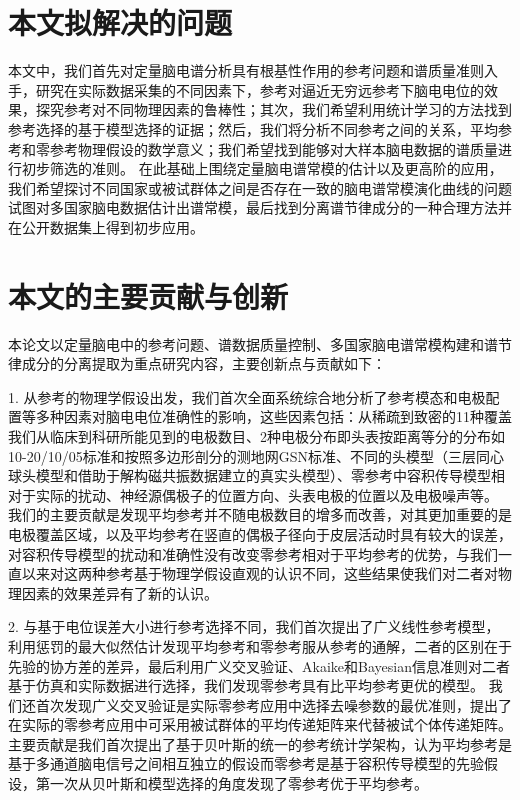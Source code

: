 \section{本文拟解决的问题}
本文中，我们首先对定量脑电谱分析具有根基性作用的参考问题和谱质量准则入手，研究在实际数据采集的不同因素下，参考对逼近无穷远参考下脑电电位的效果，探究参考对不同物理因素的鲁棒性；其次，我们希望利用统计学习的方法找到参考选择的基于模型选择的证据；然后，我们将分析不同参考之间的关系，平均参考和零参考物理假设的数学意义；我们希望找到能够对大样本脑电数据的谱质量进行初步筛选的准则。
在此基础上围绕定量脑电谱常模的估计以及更高阶的应用，我们希望探讨不同国家或被试群体之间是否存在一致的脑电谱常模演化曲线的问题试图对多国家脑电数据估计出谱常模，最后找到分离谱节律成分的一种合理方法并在公开数据集上得到初步应用。

\section{本文的主要贡献与创新}
本论文以定量脑电中的参考问题、谱数据质量控制、多国家脑电谱常模构建和谱节律成分的分离提取为重点研究内容，主要创新点与贡献如下：

1. 从参考的物理学假设出发，我们首次全面系统综合地分析了参考模态和电极配置等多种因素对脑电电位准确性的影响，这些因素包括：从稀疏到致密的11种覆盖我们从临床到科研所能见到的电极数目、2种电极分布即头表按距离等分的分布如10-20/10/05标准和按照多边形剖分的测地网GSN标准、不同的头模型（三层同心球头模型和借助于解构磁共振数据建立的真实头模型）、零参考中容积传导模型相对于实际的扰动、神经源偶极子的位置方向、头表电极的位置以及电极噪声等。 我们的主要贡献是发现平均参考并不随电极数目的增多而改善，对其更加重要的是电极覆盖区域，以及平均参考在竖直的偶极子径向于皮层活动时具有较大的误差，对容积传导模型的扰动和准确性没有改变零参考相对于平均参考的优势，与我们一直以来对这两种参考基于物理学假设直观的认识不同，这些结果使我们对二者对物理因素的效果差异有了新的认识。

2. 与基于电位误差大小进行参考选择不同，我们首次提出了广义线性参考模型，利用惩罚的最大似然估计发现平均参考和零参考服从参考的通解，二者的区别在于先验的协方差的差异，最后利用广义交叉验证、Akaike和Bayesian信息准则对二者基于仿真和实际数据进行选择，我们发现零参考具有比平均参考更优的模型。 我们还首次发现广义交叉验证是实际零参考应用中选择去噪参数的最优准则，提出了在实际的零参考应用中可采用被试群体的平均传递矩阵来代替被试个体传递矩阵。 主要贡献是我们首次提出了基于贝叶斯的统一的参考统计学架构，认为平均参考是基于多通道脑电信号之间相互独立的假设而零参考是基于容积传导模型的先验假设，第一次从贝叶斯和模型选择的角度发现了零参考优于平均参考。

